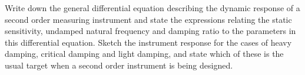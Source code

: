 \documentclass[a4paper,11pt]{book}
\begin{document}
\begin{question}
Write down the general differential equation describing the dynamic response of a second
order measuring instrument and state the expressions relating the static sensitivity, undamped
natural frequency and damping ratio to the parameters in this differential equation. Sketch
the instrument response for the cases of heavy damping, critical damping and light damping,
and state which of these is the usual target when a second order instrument is being designed.

\examspace*{40em}

\end{question}
\begin{solution}


\end{solution}
\end{document}
